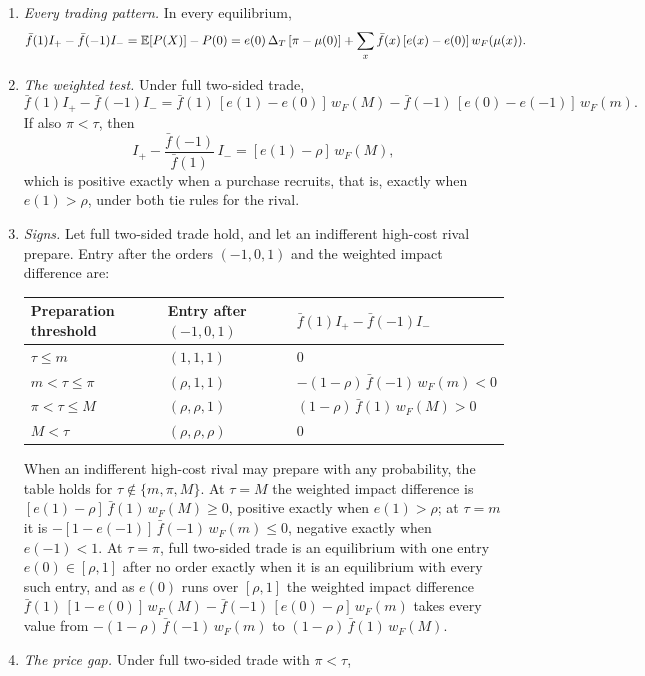 \begin{proposition}\label{prop:spread}
\leavevmode
\begin{enumerate}[label=(\roman*),leftmargin=2em]
\item \emph{Every trading pattern.} In every equilibrium,
\[
\bar f(1)I_+-\bar f(-1)I_-=\mathbb{E}[P(X)]-P(0)=e(0)\,\Delta_T\,[\pi-\mu(0)]+\sum_x\bar f(x)\,[e(x)-e(0)]\,w_F(\mu(x)).
\]
\item \emph{The weighted test.} Under full two-sided trade,
\[
\bar f(1)I_+-\bar f(-1)I_-=\bar f(1)\,[e(1)-e(0)]\,w_F(M)-\bar f(-1)\,[e(0)-e(-1)]\,w_F(m).
\]
If also \(\pi<\tau\), then
\[
I_+-\frac{\bar f(-1)}{\bar f(1)}\,I_-=[e(1)-\rho]\,w_F(M),
\]
which is positive exactly when a purchase recruits, that is, exactly when \(e(1)>\rho\), under both tie rules for the rival.
\item \emph{Signs.} Let full two-sided trade hold, and let an indifferent high-cost rival prepare. Entry after
the orders \((-1,0,1)\) and the weighted impact difference are:
\begin{center}
\begin{tabular}{@{}lll@{}}
\toprule
Preparation threshold & Entry after \((-1,0,1)\) & \(\bar f(1)I_+-\bar f(-1)I_-\)\\
\midrule
\(\tau\le m\) & \((1,1,1)\) & \(0\)\\
\(m<\tau\le\pi\) & \((\rho,1,1)\) & \(-(1-\rho)\,\bar f(-1)\,w_F(m)<0\)\\
\(\pi<\tau\le M\) & \((\rho,\rho,1)\) & \((1-\rho)\,\bar f(1)\,w_F(M)>0\)\\
\(M<\tau\) & \((\rho,\rho,\rho)\) & \(0\)\\
\bottomrule
\end{tabular}
\end{center}
When an indifferent high-cost rival may prepare with any probability, the table holds for
\(\tau\notin\{m,\pi,M\}\). At \(\tau=M\) the weighted impact difference is \([e(1)-\rho]\,\bar f(1)\,w_F(M)\ge0\),
positive exactly when \(e(1)>\rho\); at \(\tau=m\) it is \(-[1-e(-1)]\,\bar f(-1)\,w_F(m)\le0\), negative exactly when
\(e(-1)<1\). At \(\tau=\pi\), full two-sided trade is an equilibrium with one entry \(e(0)\in[\rho,1]\) after no
order exactly when it is an equilibrium with every such entry, and as \(e(0)\) runs over \([\rho,1]\) the weighted
impact difference \(\bar f(1)\,[1-e(0)]\,w_F(M)-\bar f(-1)\,[e(0)-\rho]\,w_F(m)\) takes every value from
\(-(1-\rho)\,\bar f(-1)\,w_F(m)\) to \((1-\rho)\,\bar f(1)\,w_F(M)\).
\item \emph{The price gap.} Under full two-sided trade with \(\pi<\tau\),

\end{enumerate}
\end{proposition}
